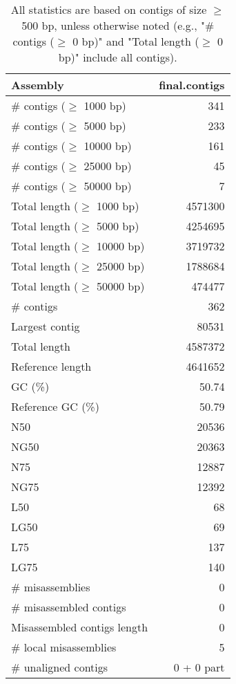 \documentclass[12pt,a4paper]{article}
\begin{document}
\begin{table}[ht]
\begin{center}
\caption{All statistics are based on contigs of size $\geq$ 500 bp, unless otherwise noted (e.g., "\# contigs ($\geq$ 0 bp)" and "Total length ($\geq$ 0 bp)" include all contigs).}
\begin{tabular}{|l*{1}{|r}|}
\hline
Assembly & final.contigs \\ \hline
\# contigs ($\geq$ 1000 bp) & 341 \\ \hline
\# contigs ($\geq$ 5000 bp) & 233 \\ \hline
\# contigs ($\geq$ 10000 bp) & 161 \\ \hline
\# contigs ($\geq$ 25000 bp) & 45 \\ \hline
\# contigs ($\geq$ 50000 bp) & 7 \\ \hline
Total length ($\geq$ 1000 bp) & 4571300 \\ \hline
Total length ($\geq$ 5000 bp) & 4254695 \\ \hline
Total length ($\geq$ 10000 bp) & 3719732 \\ \hline
Total length ($\geq$ 25000 bp) & 1788684 \\ \hline
Total length ($\geq$ 50000 bp) & 474477 \\ \hline
\# contigs & 362 \\ \hline
Largest contig & 80531 \\ \hline
Total length & 4587372 \\ \hline
Reference length & 4641652 \\ \hline
GC (\%) & 50.74 \\ \hline
Reference GC (\%) & 50.79 \\ \hline
N50 & 20536 \\ \hline
NG50 & 20363 \\ \hline
N75 & 12887 \\ \hline
NG75 & 12392 \\ \hline
L50 & 68 \\ \hline
LG50 & 69 \\ \hline
L75 & 137 \\ \hline
LG75 & 140 \\ \hline
\# misassemblies & 0 \\ \hline
\# misassembled contigs & 0 \\ \hline
Misassembled contigs length & 0 \\ \hline
\# local misassemblies & 5 \\ \hline
\# unaligned contigs & 0 + 0 part \\ \hline

\end{tabular}
\end{center}
\end{table}
\end{document}
